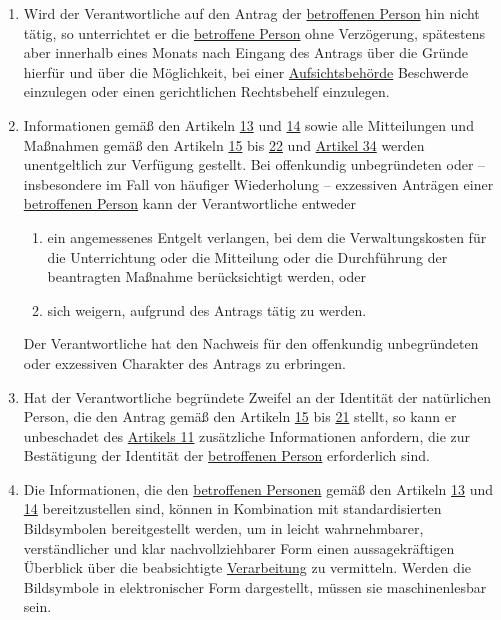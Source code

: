 \begin{enumerate}
  \item Wird der Verantwortliche auf den Antrag der \hyperref[itm:04-1]{betroffenen Person} hin nicht tätig, so unterrichtet er die
   \hyperref[itm:04-1]{betroffene Person} ohne Verzögerung, spätestens aber innerhalb eines Monats nach Eingang des Antrags über die Gründe
   hierfür und über die Möglichkeit, bei einer \hyperref[itm:04-21]{Aufsichtsbehörde} Beschwerde einzulegen oder einen gerichtlichen
   Rechtsbehelf einzulegen.
  \label{itm:12-4}

  \item Informationen gemäß den Artikeln \hyperref[ch:13]{13} und \hyperref[ch:14]{14} sowie alle Mitteilungen und
   Maßnahmen gemäß den Artikeln \hyperref[ch:15]{15} bis \hyperref[ch:22]{22} und \hyperref[ch:34]{Artikel 34} werden
   unentgeltlich zur Verfügung gestellt. Bei offenkundig unbegründeten oder -- insbesondere im Fall von häufiger
   Wiederholung -- exzessiven Anträgen einer \hyperref[itm:04-1]{betroffenen Person} kann der Verantwortliche entweder
  \label{itm:12-5}

  \begin{enumerate}
  
    \item ein angemessenes Entgelt verlangen, bei dem die Verwaltungskosten für die Unterrichtung oder die Mitteilung
     oder die Durchführung der beantragten Maßnahme berücksichtigt werden, oder
    \label{itm:12-5a}

    \item sich weigern, aufgrund des Antrags tätig zu werden.
    \label{itm:12-5b}

  \end{enumerate}

  Der Verantwortliche hat den Nachweis für den offenkundig unbegründeten oder exzessiven Charakter des Antrags zu
  erbringen.

  \item Hat der Verantwortliche begründete Zweifel an der Identität der natürlichen Person, die den Antrag gemäß den
   Artikeln \hyperref[ch:15]{15} bis \hyperref[ch:21]{21} stellt, so kann er unbeschadet des \hyperref[ch:11]
   {Artikels 11} zusätzliche Informationen anfordern, die zur Bestätigung der Identität der \hyperref[itm:04-1]{betroffenen Person}
   erforderlich sind.
  \label{itm:12-6}

  \item Die Informationen, die den \hyperref[itm:04-1]{betroffenen Personen} gemäß den Artikeln \hyperref[ch:13]{13} und \hyperref[ch:14]
   {14} bereitzustellen sind, können in Kombination mit standardisierten Bildsymbolen bereitgestellt werden, um in
   leicht wahrnehmbarer, verständlicher und klar nachvollziehbarer Form einen aussagekräftigen Überblick über die
   beabsichtigte \hyperref[itm:04-2]{Verarbeitung} zu vermitteln. Werden die Bildsymbole in elektronischer Form dargestellt, müssen sie
   maschinenlesbar sein.
  \label{itm:12-7}


\end{enumerate}
